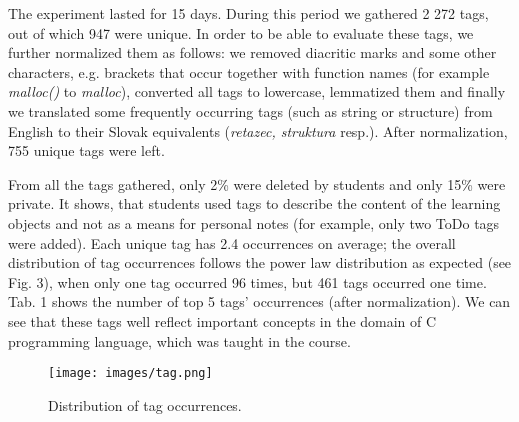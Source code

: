 \documentclass{IEEEtran}     %
\begin{document}
The experiment lasted for 15 days. During this period we
gathered 2 272 tags, out of which 947 were unique. In order
to be able to evaluate these tags, we further normalized them
as follows: we removed diacritic marks and some other
characters, e.g. brackets that occur together with function
names (for example \textit{malloc()} to \textit{malloc}), converted all tags to
lowercase, lemmatized them and finally we translated some
frequently occurring tags (such as string or structure) from
English to their Slovak equivalents (\textit{retazec, struktura} resp.).
After normalization, 755 unique tags were left.

From all the tags gathered, only 2\% were deleted by
students and only 15\% were private. It shows, that students
used tags to describe the content of the learning objects and
not as a means for personal notes (for example, only two
ToDo tags were added). Each unique tag has 2.4 occurrences
on average; the overall distribution of tag occurrences
follows the power law distribution as expected (see Fig. 3),
when only one tag occurred 96 times, but 461 tags occurred
one time. Tab. 1 shows the number of top 5 tags'
occurrences (after normalization). We can see that these tags
well reflect important concepts in the domain of C
programming language, which was taught in the course.

\begin{figure}[h!!]
\centering
\texttt{[image: images/tag.png]}
\caption{ Distribution of tag occurrences. }
\label{tag}
\end{figure}
\end{document}
